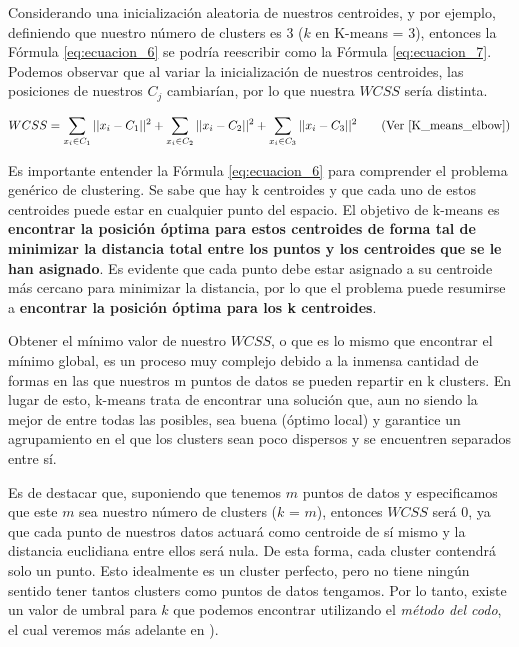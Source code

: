 \documentclass[12pt,a4paper]{article}
\begin{document}
\begin{sloppypar}
Considerando una inicialización aleatoria de nuestros centroides, y por ejemplo, definiendo que nuestro número de clusters es 3 ($k$ en K-means = 3), entonces la Fórmula \ref{eq:ecuacion_6} se podría reescribir como la Fórmula \ref{eq:ecuacion_7}. Podemos observar que al variar la inicialización de nuestros centroides, las posiciones de nuestros $C_{j}$ cambiarían, por lo que nuestra $WCSS$ sería distinta. 

\begin{equation}\label{eq:ecuacion_7}
WCSS =  \sum_{x_{i} \in C_{1}}||x_{i}-C_{1}||^2 + \sum_{x_{i} \in C_{2}}||x_{i}-C_{2}||^2 + \sum_{x_{i} \in C_{3}}||x_{i}-C_{3}||^2     \qquad  \text{(Ver \cite{K_means_elbow})}
\end{equation}

\cleardoublepage
Es importante entender la Fórmula \ref{eq:ecuacion_6} para comprender el problema genérico de clustering. Se sabe que hay k centroides y que cada uno de estos centroides puede estar en cualquier punto del espacio. El objetivo de k-means es \textbf{encontrar la posición óptima para estos centroides de forma tal de minimizar la distancia total entre los puntos y los centroides que se le han asignado}. Es evidente que cada punto debe estar asignado a su centroide más cercano para minimizar la distancia, por lo que el problema puede resumirse a \textbf{encontrar la posición óptima para los k centroides}.

Obtener el mínimo valor de nuestro $WCSS$, o que es lo mismo que encontrar el mínimo global, es un proceso muy complejo debido a la inmensa cantidad de formas en las que nuestros m puntos de datos se pueden repartir en k clusters. En lugar de esto, k-means trata de encontrar una solución que, aun no siendo la mejor de entre todas las posibles, sea buena (óptimo local) y garantice un agrupamiento en el que los clusters sean poco dispersos y se encuentren separados entre sí.

Es de destacar que, suponiendo que tenemos $m$ puntos de datos y especificamos que este $m$ sea nuestro número de clusters ($k$ = $m$), entonces $WCSS$ será 0, ya que cada punto de nuestros datos actuará como centroide de sí mismo y la distancia euclidiana entre ellos será nula. De esta forma, cada cluster contendrá solo un punto. Esto idealmente es un cluster perfecto, pero no tiene ningún sentido tener tantos clusters como puntos de datos tengamos. Por lo tanto, existe un valor de umbral para $k$ que podemos encontrar utilizando el \textit{método del codo}, el cual veremos más adelante en \textit{}).


\end{sloppypar}
\end{document}
